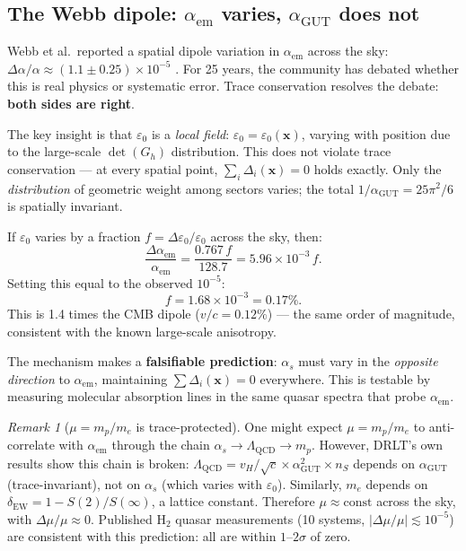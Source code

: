 \documentclass[12pt]{article}
\theoremstyle{remark}
\newtheorem{remark}[theorem]{Remark}
\theoremstyle{definition}
\begin{document}
\subsection{The Webb dipole: $\alpha_\text{em}$ varies, $\alpha_\text{GUT}$ does not}

Webb et al.\ reported a spatial dipole variation in $\alpha_\text{em}$ across the sky: $\Delta\alpha/\alpha \approx (1.1 \pm 0.25) \times 10^{-5}$ \cite{Webb}. For 25 years, the community has debated whether this is real physics or systematic error. Trace conservation resolves the debate: \textbf{both sides are right}.

The key insight is that $\varepsilon_0$ is a \emph{local field}: $\varepsilon_0 = \varepsilon_0(\mathbf{x})$, varying with position due to the large-scale $\det(G_h)$ distribution. This does not violate trace conservation --- at every spatial point, $\sum_i \Delta_i(\mathbf{x}) = 0$ holds exactly. Only the \emph{distribution} of geometric weight among sectors varies; the total $1/\alpha_\text{GUT} = 25\pi^2/6$ is spatially invariant.

If $\varepsilon_0$ varies by a fraction $f = \Delta\varepsilon_0/\varepsilon_0$ across the sky, then:
\begin{equation}
\frac{\Delta\alpha_\text{em}}{\alpha_\text{em}} = \frac{0.767\,f}{128.7} = 5.96 \times 10^{-3}\,f.
\end{equation}
Setting this equal to the observed $10^{-5}$:
\begin{equation}
f = 1.68 \times 10^{-3} = 0.17\%.
\end{equation}
This is 1.4 times the CMB dipole ($v/c = 0.12\%$) --- the same order of magnitude, consistent with the known large-scale anisotropy.

The mechanism makes a \textbf{falsifiable prediction}: $\alpha_s$ must vary in the \emph{opposite direction} to $\alpha_\text{em}$, maintaining $\sum\Delta_i(\mathbf{x}) = 0$ everywhere. This is testable by measuring molecular absorption lines in the same quasar spectra that probe $\alpha_\text{em}$.

\begin{remark}[$\mu = m_p/m_e$ is trace-protected]
One might expect $\mu = m_p/m_e$ to anti-correlate with $\alpha_\text{em}$ through the chain $\alpha_s \to \Lambda_\text{QCD} \to m_p$. However, DRLT's own results show this chain is broken: $\Lambda_\text{QCD} = v_H/\sqrt{c} \times \alpha_\text{GUT}^2 \times n_S$ depends on $\alpha_\text{GUT}$ (trace-invariant), not on $\alpha_s$ (which varies with $\varepsilon_0$). Similarly, $m_e$ depends on $\delta_\text{EW} = 1 - S(2)/S(\infty)$, a lattice constant. Therefore $\mu \approx \text{const}$ across the sky, with $\Delta\mu/\mu \approx 0$. Published H$_2$ quasar measurements (10 systems, $|\Delta\mu/\mu| \lesssim 10^{-5}$) are consistent with this prediction: all are within $1$--$2\sigma$ of zero.
\end{remark}
\end{document}
